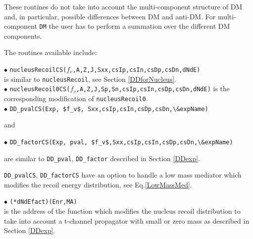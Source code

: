 \documentclass[12pt,a4paper]{article}
\begin{document}
These routines do not   take into account the multi-component structure of DM and, in particular, possible   
differences between DM and anti-DM.    For multi-component {\tt DM} the user has to perform a summation over the different DM components. 

The routines available include:
   
\noindent
$\bullet$ \verb|nucleusRecoilCS(|$f_v$\verb|,A,Z,J,Sxx,csIp,csIn,csDp,csDn,dNdE)|\\
is similar to \verb|nucleusRecoil|, see Section \ref{DDforNucleus}.  \\
\noindent
$\bullet$ \verb|nucleusRecoil0CS(|$f_v$\verb|,A,Z,J,Sp,Sn,csIp,csIn,csDp,csDn,dNdE)|
is the corresponding modification of \verb|nucleusRecoil0|.\\

\noindent
$\bullet$ \verb|DD_pvalCS(Exp, $f_v$, Sxx,csIp,csIn,csDp,csDn,\&expName)|

\noindent
and

\noindent
$\bullet$ \verb|DD_factorCS(Exp, pval, $f_v$,Sxx,csIp,csIn,csDp,csDn,\&expName)|

\noindent
are similar to  \verb|DD_pval|, \verb|DD_factor| described in Section \ref{DDexp}.

\verb|DD_pvalCS|, \verb|DD_factorCS|   have an option to handle  a low mass mediator which  modifies the recoil energy
distribution, see Eq.\ref{LowMassMed}.



\noindent
$\bullet$ \verb|(*dNdEfact)(Enr,MA)|\\
is the address of the function which modifies the nucleus recoil distribution to take into account a 
t-channel propagator  with  small or zero mass as described in Section \ref{DDexp}.

\end{document}
